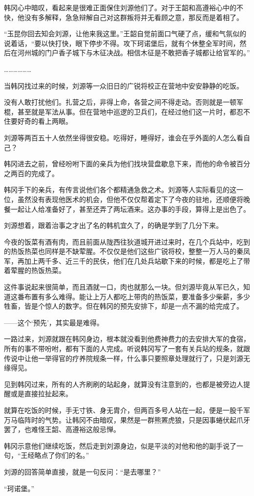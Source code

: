 韩冈心中暗叹，看起来是很难正面保住刘源他们了。对于王韶和高遵裕心中的不快，他没有多解释，急急辩解自己对这群叛将并无看顾之意，那反而是着相了。

“玉昆你回去知会刘源，让他来我这里。”王韶自觉前面口气硬了点，缓和气氛似的说着话，“要以快打快，眼下停步不得。攻下珂诺堡后，就有个休整全军时间，然后在河州城的门户香子城下与木征决战。相信木征是不敢把香子城都让给官军的。”

………………

当韩冈找过来的时候，刘源等一众旧日的广锐将校正在营地中安安静静的吃饭。

没有人敢打扰他们。扎营之后，非得上命，各营之间不得走动。否则就是一顿军棍，甚至就是军法从事。但在营地中巡逻的卫兵们，在经过他们这一片时，都忍不住要好奇的看上两眼。

刘源等两百五十人依然坐得很安稳。吃得好，睡得好，谁会在乎外面的人怎么看自己？

韩冈进去之前，曾经吩咐下面的亲兵为他们找块营盘歇息下来，而他的命令被百分之两百的完成了。

韩冈手下的亲兵，有传言说他们各个都精通急救之术。刘源等人实际看见的这一位，虽然没有表现他医术的机会，但他不仅仅帮着定下了今夜的驻地，还顺便将晚餐一起让人给准备好了，甚至还弄了两坛酒来。这办事的手段，算得上是出色了。

刘源想着，跟着治事之才出了名的韩机宜久了，的确是学到了几分下来。

今夜的饭菜有酒有肉，而且前面从陇西往狄道城开进过来时，在几个兵站中，吃到的热饭热菜也同样是不缺荤腥。不仅仅是他们这些广锐将校，整整一万人马的秦凤军，再加上两千多、近三千的民伕，他们在几处兵站歇下来的时候，都是吃上了带着荤腥的热饭热菜。

这件事说起来很简单，而且酒就一口，肉也就那么一块。但刘源毕竟从军已久，知道这番布置有多么难得。能让上万人都吃上带肉的热饭菜，要准备多少柴薪，多少牲畜，皆是个惊人的数字。但在韩冈的预先安排下，却是一点不漏的给完成了。

——这个‘预先’，其实最是难得。

一路过来，刘源就跟在韩冈身边，根本就没看到他费神费力的去安排大军的食宿，所有的事不带吩咐，都有下面的人完成。听说韩冈写了一套有关兵站的规条，就跟传说中让他一举得官的疗养院规条一样，什么事只要照章处理就行了，只是刘源无缘得见。

见到韩冈过来，所有的人齐刷刷的站起身，就算没有注意到的，也都是被旁边人提醒或是直接拉扯起来。

就算在吃饭的时候，手无寸铁、身无胄介，但两百多号人站在一起，便是一股千军万马临阵时的气势。让韩冈不由暗叹，果然是一群熊罴虎狼，只是因事蜷伏起爪牙罢了，也难怪王韶、高遵裕这般忌惮。

韩冈示意他们继续吃饭，然后走到刘源身边，似是平淡的对他和他的副手说了一句，“王经略点了你们的名。”

刘源的回答简单直接，就是一句反问：“是去哪里？”

“珂诺堡。”


